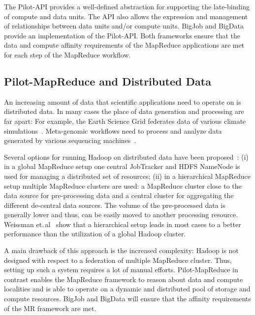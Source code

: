 \documentclass{acm_proc_article-sp}
\newcommand{\pilotmapreduce}{Pilot-MapReduce\xspace}
\begin{document}
The Pilot-API provides a well-defined abstraction for supporting the
late-binding of compute and data units. The API also allows the expression and
management of relationships between data units and/or compute units. BigJob
and BigData provide an implementation of the Pilot-API. Both frameworks ensure
that the data and compute affinity requirements of the MapReduce applications
are met for each step of the MapReduce workflow.


\subsection{Pilot-MapReduce and Distributed Data}
\label{sec:pmr-distributed}
An increasing amount of data that scientific applications need to operate on 
is distributed data. In many cases the place of data 
generation and processing are far apart: For example, the Earth Science Grid 
federates data of various climate simulations~\cite{ESG}. Meta-genomic 
workflows need to process and analyze data generated by various sequencing 
machines~\cite{Jha:2011fk}.

Several options for running Hadoop on distributed data have been
proposed~\cite{weissman-mr-11}: (i) in a global MapReduce setup one central
JobTracker and HDFS NameNode is used for managing a distributed set of
resources; (ii) in a hierarchical MapReduce setup multiple MapReduce clusters
are used: a MapReduce cluster close to the data source for pre-processing data
and a central cluster for aggregating the different de-central data sources.
The volume of the pre-processed data is generally lower and thus, can be
easily moved to another processing resource. Weissman
et.\,al~\cite{weissman-mr-11} show that a hierarchical setup leads in most
cases to a better performance than the utilization of a global Hadoop cluster.

A main drawback of this approach is the increased complexity: Hadoop is not 
designed with respect to a federation of multiple MapReduce cluster. Thus, 
setting up such a system requires a lot of manual efforts. \pilotmapreduce in 
contrast enables the MapReduce framework to reason about data and compute 
localities and is able to operate on a dynamic and distributed pool of storage 
and compute resources. BigJob and BigData will ensure that the affinity 
requirements of the MR framework are met.
\end{document}
